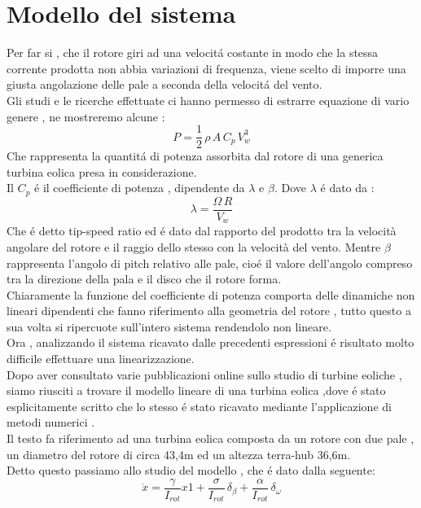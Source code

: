 \documentclass[a4paper,13pt]{article}
\begin{document}
\section{Modello del sistema}
Per far si , che il rotore giri ad una velocit\'a costante in modo che la stessa corrente prodotta non abbia variazioni di frequenza, viene scelto di imporre una giusta angolazione delle pale a seconda della velocit\'a del vento.\\
Gli studi e le ricerche effettuate ci hanno permesso di estrarre equazione di vario genere , ne mostreremo alcune :
\begin{equation}
P=\frac{1}{2}\,\rho\,A\,C_p\,V_w^3
\end{equation}
Che rappresenta la quantit\'a di potenza assorbita dal rotore di una generica turbina eolica presa in considerazione.\\
Il $C_p$ \'e il coefficiente di potenza , dipendente da $\lambda$ e $\beta$.
Dove $\lambda$ \'e dato da :
\begin{equation}
\lambda=\frac{\Omega\,R}{V_w}
\end{equation}
Che \'e detto tip-speed ratio ed \'e dato dal rapporto del prodotto tra la velocità angolare
del rotore e il raggio dello stesso con la velocità del vento.
Mentre $\beta$ rappresenta l'angolo di pitch relativo alle pale, cio\'e il valore dell'angolo compreso tra la direzione della pala e il disco che il rotore forma.\\
Chiaramente la funzione del coefficiente di potenza comporta delle dinamiche non 
lineari dipendenti che fanno riferimento alla geometria del rotore , tutto questo a sua volta si ripercuote sull'intero sistema rendendolo non lineare.\\  
Ora , analizzando il sistema ricavato dalle precedenti espressioni \'e risultato molto difficile effettuare una linearizzazione.\\
Dopo aver consultato varie pubblicazioni online sullo studio di turbine eoliche ,
siamo riusciti a trovare il modello lineare di una turbina eolica ,dove \'e stato esplicitamente scritto
che lo stesso \'e stato ricavato mediante l'applicazione di metodi numerici .\\
Il testo fa riferimento ad una turbina eolica composta da un rotore con due pale ,
un diametro del rotore di circa 43,4m ed un altezza terra-hub 36,6m.\\
Detto questo passiamo allo studio del modello , che \'e dato dalla seguente:
\begin{equation}
\dot{x}=\frac{\gamma}{I_{rot}}x1+\frac{\sigma}{I_{rot}}\,\delta_\beta+\frac{\alpha}{I_{rot}}\,\delta_\omega
\end{equation}
\end{document}
